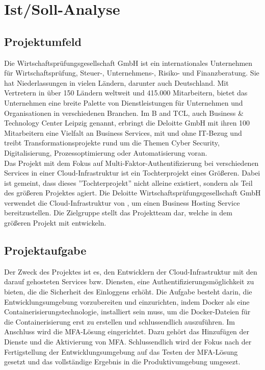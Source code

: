 \section{Ist/Soll-Analyse} 
\label{sec:IstSollAnalyse}

\subsection{Projektumfeld} 
\label{sec:Projektumfeld}
Die \cite{Deloitte} Wirtschaftsprüfungsgesellschaft GmbH ist ein internationales 
Unternehmen für Wirtschaftsprüfung, Steuer-, Unternehmens-, Risiko- und Finanzberatung.
Sie hat Niederlassungen in vielen Ländern, darunter auch Deutschland. 
Mit Vertretern in über 150 Ländern weltweit und 415.000 Mitarbeitern, bietet das Unternehmen eine breite Palette 
von Dienstleistungen für Unternehmen und Organisationen in verschiedenen Branchen.
Im \acs{B and TCL}, auch Business \& Technology Center Leipzig genannt, erbringt die Deloitte
GmbH mit ihren 100 Mitarbeitern eine Vielfalt an Business Services, mit und ohne IT-Bezug und treibt
Transformationsprojekte rund um die Themen Cyber Security, Digitalisierung,
Prozessoptimierung oder Automatisierung voran. 
\\Das Projekt mit dem Fokus auf Multi-Faktor-Authentifizierung bei verschiedenen Services in einer 
Cloud-Infrastruktur ist ein Tochterprojekt eines Größeren. Dabei ist gemeint, dass dieses 
''Tochterprojekt'' nicht alleine existiert, sondern als Teil des größeren Projektes agiert. 
Die Deloitte Wirtschaftsprüfungsgesellschaft GmbH verwendet die Cloud-Infrastruktur von 
\cite{ovhcloud}, um einen Business Hosting Service bereitzustellen.
Die Zielgruppe stellt das Projektteam dar, welche in dem größeren Projekt mit entwickeln.

\subsection{Projektaufgabe}
\label{sec:Projektaufgabe}
Der Zweck des Projektes ist es, den Entwicklern der Cloud-Infrastruktur mit den darauf gehosteten Services bzw. 
Diensten, eine Authentifizierungsmöglichkeit zu bieten, die die Sicherheit des Einloggens erhöht.
Die Aufgabe besteht darin, die Entwicklungsumgebung vorzubereiten und einzurichten, indem Docker als 
eine Containerisierungstechnologie, installiert sein muss, um die Docker-Dateien für die Containerisierung 
erst zu erstellen und schlussendlich auszuführen. Im Anschluss wird die \acs{MFA}-Lösung eingerichtet. Dazu gehört 
das Hinzufügen der Dienste und die Aktivierung von \acs{MFA}. Schlussendlich wird der Fokus nach der Fertigstellung 
der Entwicklungsumgebung auf das Testen der \acs{MFA}-Lösung gesetzt und das vollständige Ergebnis in die 
Produktivumgebung umgesezt.

